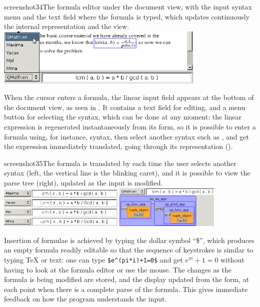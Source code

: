 \begin{myfig}{screenshot34}{The formula editor under the document view, with the input syntax menu and the text field where the formula is typed, which updates continuously the internal {\openmath} representation and the {\mathml} view.}
  \includegraphics[width=10cm]{projects/sentido/sentido_equation_editor_QMath-en}
\end{myfig}

When the cursor enters a formula, the linear input field appears
at the bottom of the document view, as seen in {}.
It contains a text field for editing, and a menu button for
selecting the syntax, which can be done at any moment:
the linear expression is regenerated instantaneously from its {\openmath} form,
so it is possible to enter a formula using, for instance,
{\mathematica} syntax, then select another syntax such as {\maple}, and get the
expression immediately translated, going through its {\openmath} representation ({}).

\begin{myfig}{screenshot35}{The formula is translated by {\sentido} each time the user selects another syntax (left, the vertical line is the blinking caret), and it is possible to view the parse tree (right), updated as the input is modified.}
  \includegraphics[width=6cm]{projects/sentido/sentido_equation_editor_Maxima_Yacas_Mpl_Mma}\quad
  \includegraphics[width=5cm]{projects/sentido/sentido_equation_editor_parse_tree}
\end{myfig}

Insertion of formulae is achieved by typing the dollar symbol ``\$'',
which produces an empty formula readily editable so that the sequence
of keystrokes is similar to typing {\TeX} or {\qmath} text:
one can type {\verb|$e^(pi*i)+1=0$|} and get $e^{\pi i}+1=0$
without having to look at the formula editor or use the mouse.
The changes as the formula is being modified are stored,
and the display updated from the {\openmath} form,
at each point when there is a complete parse of the formula.
This gives immediate feedback on how the program understands the input.

